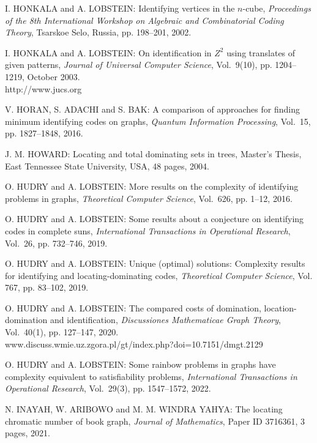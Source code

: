 \begin{thebibliography}{999}
I. HONKALA and A. LOBSTEIN: Identifying vertices in the $n$-cube, {\it Proceedings of the 8th International Workshop on Algebraic and Combinatorial Coding Theory}, Tsarskoe Selo, Russia, pp. 198--201, 2002.

I. HONKALA and A. LOBSTEIN: On identification in $Z^2$ using translates of given patterns, {\it Journal of Universal Computer Science}, Vol.~9(10), pp. 1204--1219, October 2003.\\
http://www.jucs.org

V. HORAN, S. ADACHI and S. BAK: A comparison of approaches for finding minimum identifying codes on graphs, {\it Quantum Information Processing}, Vol.~15, pp. 1827--1848, 2016.

J. M. HOWARD: Locating and total dominating sets in trees, Master's Thesis, East Tennessee State University, USA, 48 pages, 2004.

O. HUDRY and A. LOBSTEIN: More results on the complexity of identifying problems in graphs, {\it Theoretical Computer Science}, Vol.~626, pp. 1--12, 2016.

O. HUDRY and A. LOBSTEIN: Some results about a conjecture on identifying codes in complete suns, {\it International Transactions in Operational Research}, Vol.~26, pp. 732--746, 2019.

O. HUDRY and A. LOBSTEIN: Unique (optimal) solutions: Complexity results for identifying and locating-dominating codes, {\it Theoretical Computer Science}, Vol. 767, pp. 83--102, 2019.%

O. HUDRY and A. LOBSTEIN: The compared costs of domination, location-domination and identification, {\it Discussiones Mathematicae Graph Theory}, Vol.~40(1), pp. 127--147, 2020.\\
www.discuss.wmie.uz.zgora.pl/gt/index.php?doi=10.7151/dmgt.2129%

O. HUDRY and A. LOBSTEIN: Some rainbow problems in graphs have complexity equivalent to satisfiability problems, {\it International Transactions in Operational Research}, Vol.~29(3), pp. 1547--1572, 2022.
  
N. INAYAH, W. ARIBOWO and M. M. WINDRA YAHYA: The locating chromatic number of book graph, {\it Journal of Mathematics}, Paper ID 3716361, 3 pages, 2021.


\end{thebibliography}
